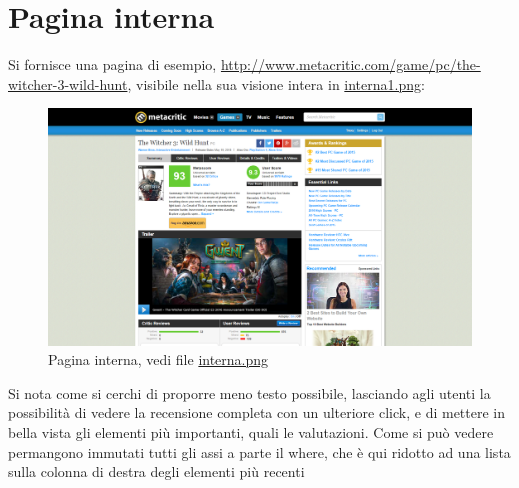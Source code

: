 \documentclass[12pt]{article}
\begin{document}
\section{Pagina interna}
Si fornisce una pagina di esempio, \url{http://www.metacritic.com/game/pc/the-witcher-3-wild-hunt}, visibile nella sua visione intera in \href{interna1.png}{interna1.png}:
\begin{figure}[H]
	\begin{center}
		\includegraphics[width=13.5cm]{interna.png}
		\caption{Pagina interna, vedi file \href{interna.png}{interna.png}}
	\end{center}
\end{figure}
Si nota come si cerchi di proporre meno testo possibile, lasciando agli utenti la possibilità di vedere la recensione completa con un ulteriore click, e di mettere in bella vista gli elementi più importanti, quali le valutazioni.
Come si può vedere permangono immutati tutti gli assi a parte il where, che è qui ridotto ad una lista sulla colonna di destra degli elementi più recenti
\newpage
\end{document}
